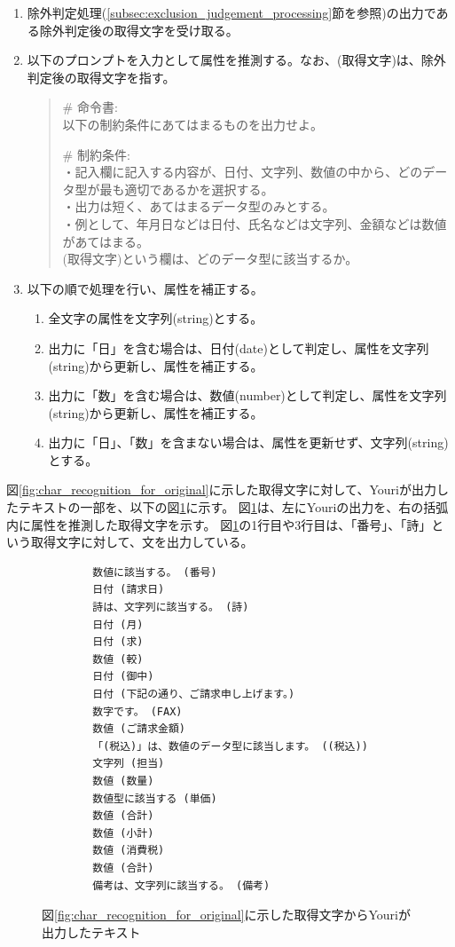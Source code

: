 \begin{enumerate}
    \item 除外判定処理(\ref{subsec:exclusion_judgement_processing}節を参照)の出力である除外判定後の取得文字を受け取る。
    \item 以下のプロンプトを入力として属性を推測する。なお、(取得文字)は、除外判定後の取得文字を指す。\\
    \begin{quote}
        \# 命令書:\\
        以下の制約条件にあてはまるものを出力せよ。
        
        \# 制約条件:\\
        ・記入欄に記入する内容が、日付、文字列、数値の中から、どのデータ型が最も適切であるかを選択する。\\
        ・出力は短く、あてはまるデータ型のみとする。\\
        ・例として、年月日などは日付、氏名などは文字列、金額などは数値があてはまる。\\
        (取得文字)という欄は、どのデータ型に該当するか。
    \end{quote}
    \item 以下の順で処理を行い、属性を補正する。
        \begin{enumerate}
            \item 全文字の属性を文字列(string)とする。
            \item 出力に「日」を含む場合は、日付(date)として判定し、属性を文字列(string)から更新し、属性を補正する。
            \item 出力に「数」を含む場合は、数値(number)として判定し、属性を文字列(string)から更新し、属性を補正する。
            \item 出力に「日」、「数」を含まない場合は、属性を更新せず、文字列(string)とする。
        \end{enumerate}
\end{enumerate}

図\ref{fig:char_recognition_for_original}に示した取得文字に対して、Youriが出力したテキストの一部を、以下の図\ref{fig:output_Youri}に示す。
図\ref{fig:output_Youri}は、左にYouriの出力を、右の括弧内に属性を推測した取得文字を示す。
図\ref{fig:output_Youri}の1行目や3行目は、「番号」、「詩」という取得文字に対して、文を出力している。

\lstset{language=}
\begin{figure}[t]
    \begin{lstlisting}
        数値に該当する。 (番号)
        日付 (請求日)
        詩は、文字列に該当する。 (詩)
        日付 (月)
        日付 (求)
        数値 (較)
        日付 (御中)
        日付 (下記の通り、ご請求申し上げます。)
        数字です。 (FAX)
        数値 (ご請求金額)
        「(税込)」は、数値のデータ型に該当します。 ((税込))
        文字列 (担当)
        数値 (数量)
        数値型に該当する (単価)
        数値 (合計)
        数値 (小計)
        数値 (消費税)
        数値 (合計)
        備考は、文字列に該当する。 (備考)
    \end{lstlisting}
    \caption{図\ref{fig:char_recognition_for_original}に示した取得文字からYouriが出力したテキスト}
    \label{fig:output_Youri}
\end{figure}

